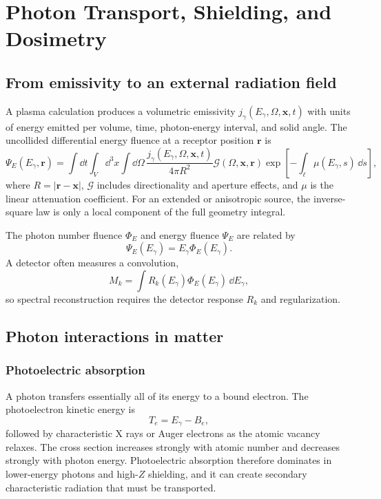 \chapter{Photon Transport, Shielding, and Dosimetry}
\label{ch:transport}

\section{From emissivity to an external radiation field}

A plasma calculation produces a volumetric emissivity $j_\gamma(E_\gamma,\Omega,\mathbf{x},t)$ with units of energy emitted per volume, time, photon-energy interval, and solid angle. The uncollided differential energy fluence at a receptor position $\mathbf{r}$ is
\begin{equation}
\Psi_E(E_\gamma,\mathbf{r})
=\int\!\dd t\int_V\!\dd^3x\int\!\dd\Omega\,
\frac{j_\gamma(E_\gamma,\Omega,\mathbf{x},t)}{4\pi R^2}
\mathcal{G}(\Omega,\mathbf{x},\mathbf{r})
\exp\!\left[-\int_{\ell}\mu(E_\gamma,s)\,\dd s\right],
\label{eq:fluence}
\end{equation}
where $R=|\mathbf{r}-\mathbf{x}|$, $\mathcal{G}$ includes directionality and aperture effects, and $\mu$ is the linear attenuation coefficient. For an extended or anisotropic source, the inverse-square law is only a local component of the full geometry integral.

The photon number fluence $\Phi_E$ and energy fluence $\Psi_E$ are related by
\begin{equation}
\Psi_E(E_\gamma)=E_\gamma\Phi_E(E_\gamma).
\end{equation}
A detector often measures a convolution,
\begin{equation}
M_k=\int R_k(E_\gamma)\Phi_E(E_\gamma)\,\dd E_\gamma,
\end{equation}
so spectral reconstruction requires the detector response $R_k$ and regularization.

\section{Photon interactions in matter}

\subsection{Photoelectric absorption}

A photon transfers essentially all of its energy to a bound electron. The photoelectron kinetic energy is
\begin{equation}
T_e=E_\gamma-B_e,
\end{equation}
followed by characteristic X rays or Auger electrons as the atomic vacancy relaxes. The cross section increases strongly with atomic number and decreases strongly with photon energy. Photoelectric absorption therefore dominates in lower-energy photons and high-$Z$ shielding, and it can create secondary characteristic radiation that must be transported.

